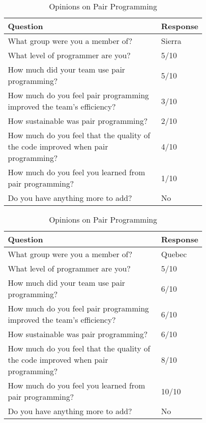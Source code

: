 \documentclass{article}
\begin{document}
\begin{table}[ht]
\centering
\renewcommand{\arraystretch}{1.3}
\caption{Opinions on Pair Programming}
\begin{tabular}{|p{0.8\linewidth}|l|}
\hline
\textbf{Question} & \textbf{Response} \\
\hline
What group were you a member of? & Sierra \\
\hline 
What level of programmer are you? & 5/10\\
\hline 
How much did your team use pair programming? & 5/10\\
\hline 
How much do you feel pair programming improved the team's efficiency? & 3/10\\
\hline 
How sustainable was pair programming? & 2/10\\
\hline 
How much do you feel that the quality of the code improved when pair programming? & 4/10\\
\hline 
How much do you feel you learned from pair programming? & 1/10\\
\hline 
Do you have anything more to add? &  No\\
\hline
\end{tabular}
\end{table}

\begin{table}[ht]
\centering
\renewcommand{\arraystretch}{1.3}
\caption{Opinions on Pair Programming}
\begin{tabular}{|p{0.8\linewidth}|l|}
\hline
\textbf{Question} & \textbf{Response} \\
\hline
What group were you a member of? & Quebec \\
\hline 
What level of programmer are you? & 5/10\\
\hline 
How much did your team use pair programming? & 6/10\\
\hline 
How much do you feel pair programming improved the team's efficiency? & 6/10\\
\hline 
How sustainable was pair programming? & 6/10\\
\hline 
How much do you feel that the quality of the code improved when pair programming? & 8/10\\
\hline 
How much do you feel you learned from pair programming? & 10/10\\
\hline 
Do you have anything more to add? &  No\\
\hline
\end{tabular}
\end{table}
\end{document}
